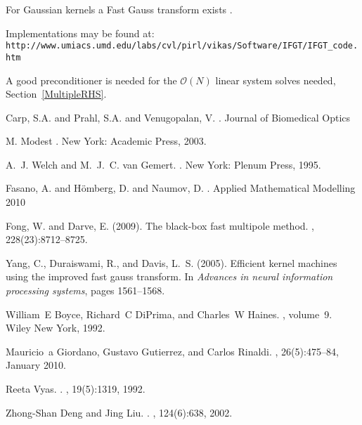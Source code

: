 \documentclass{article}         %
\theoremstyle{definition}
\theoremstyle{remark}
\begin{document}
For Gaussian kernels a Fast Gauss transform exists \cite{yang2005efficient}.


Implementations may be found at:
\texttt{http://www.umiacs.umd.edu/labs/cvl/pirl/vikas/Software/IFGT/IFGT\_code.htm}

A good preconditioner is needed for the $\mathcal{O}(N)$ linear
system solves needed, Section~\ref{MultipleRHS}.


\begin{thebibliography}{}
Carp, S.A. and Prahl, S.A. and Venugopalan, V.
. 
\newblock Journal of Biomedical Optics

M. Modest 
.
\newblock New York: Academic Press, 2003.

A.~J. Welch and M.~J.~C. van Gemert.
.
\newblock New York: Plenum Press, 1995.

Fasano, A. and H{\"o}mberg, D. and Naumov, D.
.
\newblock Applied Mathematical Modelling 2010

Fong, W. and Darve, E. (2009).
\newblock The black-box fast multipole method.
, 228(23):8712--8725.

Yang, C., Duraiswami, R., and Davis, L.~S. (2005).
\newblock Efficient kernel machines using the improved fast gauss transform.
\newblock In {\em Advances in neural information processing systems}, pages
  1561--1568.

William~E Boyce, Richard~C DiPrima, and Charles~W Haines.
,
  volume~9.
\newblock Wiley New York, 1992.

Mauricio~a Giordano, Gustavo Gutierrez, and Carlos Rinaldi.
, 26(5):475--84, January 2010.

Reeta Vyas.
.
, 19(5):1319, 1992.

Zhong-Shan Deng and Jing Liu.
.
, 124(6):638, 2002.

\end{thebibliography}
\end{document}
